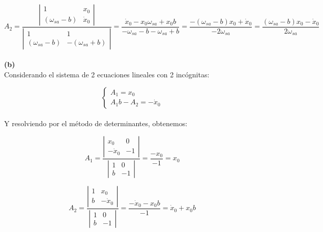 \documentclass[letter,11pt]{article}
\begin{document}
\begin{equation}
    A_2 = \dfrac{
        \left|
            \begin{smallmatrix}
                1 & x_0 \\
                (\omega_{sa} - b) & \dot{x}_0
            \end{smallmatrix}
        \right|
    }{
        \left|
            \begin{smallmatrix}
                1 & 1 \\
                (\omega_{sa} - b) & -(\omega_{sa} + b)
            \end{smallmatrix}
        \right|
    }
    = \dfrac{\dot{x}_0 - x_0\omega_{sa} + x_0 b}{-\omega_{sa} - b - \omega_{sa} + b}
    = \dfrac{-(\omega_{sa} - b) x_0 + \dot{x}_0}{-2\omega_{sa}}
    = \dfrac{(\omega_{sa} - b) x_0 - \dot{x}_0}{2\omega_{sa}}
\end{equation}
\\

\textbf{(b)} \\

Considerando el sistema de 2 ecuaciones lineales con 2 incógnitas:

\begin{equation*}
    \begin{cases}
        A_1 = x_0 \\
        A_1 b - A_2 = -\dot{x}_0
    \end{cases}
\end{equation*}
\\

Y resolviendo por el método de determinantes, obtenemos:

\begin{equation}
    A_1 = \dfrac{
        \left|
            \begin{smallmatrix}
                x_0 & 0 \\
                -\dot{x}_0 & -1
            \end{smallmatrix}
        \right|
    }{
        \left|
            \begin{smallmatrix}
                1 & 0 \\
                b & -1
            \end{smallmatrix}
        \right|
    }
    = \dfrac{-x_0}{-1}
    = x_0
\end{equation}

\begin{equation}
    A_2 = \dfrac{
        \left|
            \begin{smallmatrix}
                1 & x_0 \\
                b & -\dot{x}_0
            \end{smallmatrix}
        \right|
    }{
        \left|
            \begin{smallmatrix}
                1 & 0 \\
                b & -1
            \end{smallmatrix}
        \right|
    }
    = \dfrac{-\dot{x}_0 - x_0 b}{-1}
    = \dot{x}_0 + x_0 b
\end{equation}
\\
\end{document}
